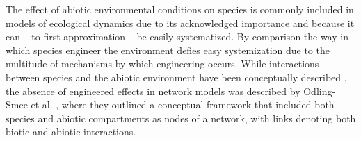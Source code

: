 \documentclass[twocolumn,preprintnumbers,amsmath,amssymb,superscriptaddress,linenumbers]{revtex4-1}
\begin{document}
The effect of abiotic environmental conditions on species is commonly included in models of ecological dynamics \cite{Woodward2010,Brose2012,Gibert2019b} due to its acknowledged importance and because it can -- to first approximation -- be easily systematized. 
By comparison the way in which species engineer the environment defies easy systemization due to the multitude of mechanisms by which engineering occurs.
While interactions between species and the abiotic environment have been conceptually described \cite{Olff2009,Getz2011}, the absence of engineered effects in network models was described by Odling-Smee et al. \cite{OdlingSmee2013}, where they outlined a conceptual framework that included both species and abiotic compartments as nodes of a network, with links denoting both biotic and abiotic interactions.

\end{document}

